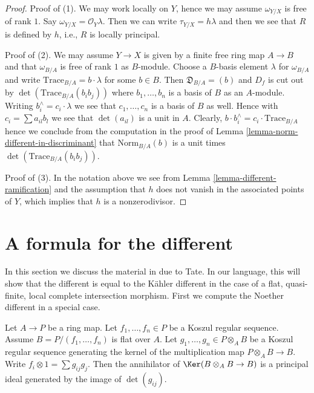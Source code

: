 \begin{proof}
Proof of (1). We may work locally on $Y$, hence we may assume
$\omega_{Y/X}$ is free of rank $1$. Say $\omega_{Y/X} = \mathcal{O}_Y\lambda$.
Then we can write $\tau_{Y/X} = h \lambda$ and then we see that
$R$ is defined by $h$, i.e., $R$ is locally principal.

\medskip\noindent
Proof of (2). We may assume $Y \to X$ is given by a finite free ring
map $A \to B$ and that $\omega_{B/A}$ is free of rank $1$ as $B$-module.
Choose a $B$-basis element $\lambda$ for $\omega_{B/A}$ and write
$\text{Trace}_{B/A} = b \cdot \lambda$ for some $b \in B$.
Then $\mathfrak{D}_{B/A} = (b)$ and $D_f$ is cut out by
$\det(\text{Trace}_{B/A}(b_ib_j))$ where $b_1, \ldots, b_n$ is a
basis of $B$ as an $A$-module. Writing
$b_i^\wedge = c_i \cdot \lambda$ we see that
$c_1, \ldots, c_n$ is a basis of $B$ as well.
Hence with $c_i = \sum a_{il}b_l$ we see that $\det(a_{il})$
is a unit in $A$. Clearly,
$b \cdot b_i^\wedge = c_i \cdot \text{Trace}_{B/A}$
hence we conclude from the computation in the proof of
Lemma \ref{lemma-norm-different-in-discriminant}
that $\text{Norm}_{B/A}(b)$ is a unit times
$\det(\text{Trace}_{B/A}(b_ib_j))$.

\medskip\noindent
Proof of (3). In the notation above we see from
Lemma \ref{lemma-different-ramification} and the assumption
that $h$ does not vanish in
the associated points of $Y$, which implies that $h$ is a nonzerodivisor.
\end{proof}







\section{A formula for the different}
\label{section-formula-different}

\noindent
In this section we discuss the material in \cite[Appendix A]{Mazur-Roberts}
due to Tate. In our language, this will show that the different is
equal to the K\"ahler different in the case of a flat, quasi-finite,
local complete intersection morphism.
First we compute the Noether different in a special case.

\begin{lemma}
\label{lemma-tate}
\begin{reference}
\cite[Appendix]{Mazur-Roberts}
\end{reference}
Let $A \to P$ be a ring map. Let $f_1, \ldots, f_n \in P$ be a
Koszul regular sequence. Assume $B = P/(f_1, \ldots, f_n)$
is flat over $A$. Let $g_1, \ldots, g_n \in P \otimes_A B$
be a Koszul regular sequence generating the kernel of the multiplication
map $P \otimes_A B \to B$. Write $f_i \otimes 1 = \sum g_{ij} g_j$.
Then the annihilator of $\Ker(B \otimes_A B \to B)$ is a principal
ideal generated by the image of $\det(g_{ij})$.
\end{lemma}

